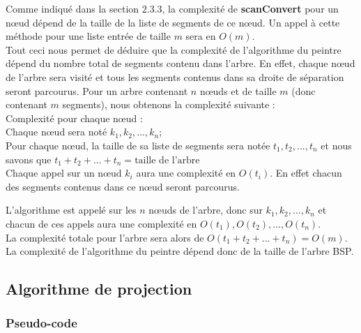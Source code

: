 \documentclass[11pt,a4paper]{article}
\theoremstyle{definition}
\theoremstyle{remark}
\begin{document}
Comme indiqué dans la section $2.3.3$, la complexité de \textbf{scanConvert} pour un nœud dépend de la taille de la liste de segments de ce nœud. Un appel à cette méthode pour une liste entrée de taille $m$ sera en $O(m)$. \\

Tout ceci nous permet de déduire que la complexité de l'algorithme du peintre dépend du nombre total de segments contenu dans l'arbre. En effet, chaque nœud de l'arbre sera visité et tous les segments contenus dans sa droite de séparation seront parcourus. Pour un arbre contenant $n$ nœuds et de taille $m$ (donc contenant $m$ segments), nous obtenons la complexité suivante :\\

Complexité pour chaque nœud :\\
Chaque nœud sera noté $k_1, k_2, ... , k_n$;\\
Pour chaque nœud, la taille de sa liste de segments sera notée $t_1, t_2, ... , t_n$ et nous savons que $t_1 + t_2 + ... + t_n = \text{taille de l'arbre}$\\
Chaque appel sur un nœud $k_i$ aura une complexité en $O(t_i)$. En effet chacun des segments contenus dans ce nœud seront parcourus.

L'algorithme est appelé sur les $n$ nœuds de l'arbre, donc sur $k_1, k_2, ... , k_n$ et chacun de ces appels aura une complexité en $O( t_1), O(t_2), ... , O(t_n)$.\\
La complexité totale pour l'arbre sera alors de $O(t_1 + t_2 + ... + t_n) = O(m)$. La complexité de l'algorithme du peintre dépend donc de la taille de l'arbre BSP.

\subsection{Algorithme de projection}

\subsubsection{Pseudo-code}
\end{document}
